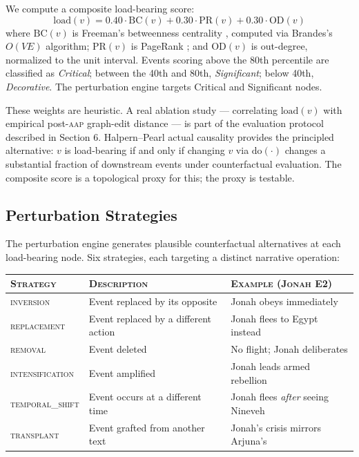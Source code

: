 \documentclass[11pt]{article}
\theoremstyle{rukha}
\newcommand{\sceq}[1]{\textsc{#1}}
\begin{document}
We compute a composite load-bearing score:
\[
  \text{load}(v) = 0.40 \cdot \text{BC}(v) + 0.30 \cdot \text{PR}(v) + 0.30 \cdot \text{OD}(v)
\]
where $\text{BC}(v)$ is Freeman's betweenness centrality
\cite{freemanbetweenness}, computed via Brandes's $O(VE)$ algorithm;
$\text{PR}(v)$ is PageRank \cite{pagerank}; and $\text{OD}(v)$ is
out-degree, normalized to the unit interval. Events scoring above the
80th percentile are classified as \emph{Critical}; between the 40th and
80th, \emph{Significant}; below 40th, \emph{Decorative}. The
perturbation engine targets Critical and Significant nodes.

These weights are heuristic. A real ablation study --- correlating
$\text{load}(v)$ with empirical post-\textsc{aap} graph-edit distance ---
is part of the evaluation protocol described in Section 6. Halpern–Pearl
actual causality \cite{halpernpearlcausality} provides the principled
alternative: $v$ is load-bearing if and only if changing $v$ via
$\text{do}(\cdot)$ changes a substantial fraction of downstream events
under counterfactual evaluation. The composite score is a topological
proxy for this; the proxy is testable.

\subsection{Perturbation Strategies}

The perturbation engine generates plausible counterfactual alternatives
at each load-bearing node. Six strategies, each targeting a distinct
narrative operation:

\begin{center}\small
\begin{tabular}{@{}l p{2.4in} l@{}}
  \toprule
  \sceq{Strategy} & \sceq{Description} & \sceq{Example (Jonah E2)} \\
  \midrule
  \textsc{inversion}        & Event replaced by its opposite           & Jonah obeys immediately \\
  \textsc{replacement}      & Event replaced by a different action     & Jonah flees to Egypt instead \\
  \textsc{removal}          & Event deleted                            & No flight; Jonah deliberates \\
  \textsc{intensification}  & Event amplified                          & Jonah leads armed rebellion \\
  \textsc{temporal\_shift}  & Event occurs at a different time         & Jonah flees \emph{after} seeing Nineveh \\
  \textsc{transplant}       & Event grafted from another text          & Jonah's crisis mirrors Arjuna's \\
  \bottomrule
\end{tabular}
\end{center}
\end{document}
